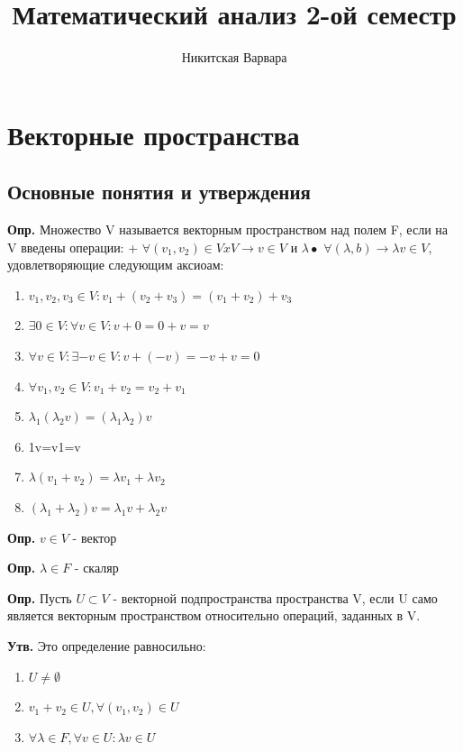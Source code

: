 \documentclass[12pt]{article}
\title{Математический анализ 2-ой семестр}
\author{Никитская Варвара}
\begin{document}
\tableofcontents
\newpage
\section{Векторные пространства}
\subsection{Основные понятия и утверждения}

\textbf{Опр.} Множество V называется векторным пространством над полем F, если на V введены операции: + $\forall (v_1, v_2) \in VxV \rightarrow v \in V$ и $\lambda \bullet$ $\forall (\lambda, b) \rightarrow \lambda v \in V$, удовлетворяющие следующим аксиоам:
\begin{enumerate} 
\item $v_1, v_2, v_3 \in V: v_1+(v_2 + v_3) = (v_1 + v_2) + v_3$ 
\item $\exists 0 \in V: \forall v \in V: v + 0 = 0 + v = v$
\item $\forall v \in V: \exists -v \in V: v + (-v) = -v + v = 0$
\item $\forall v_1, v_2 \in V: v_1 + v_2 = v_2 + v_1 $
\item $\lambda_1(\lambda_2 v) = (\lambda_1\lambda_2 )v$
\item 1v=v1=v
\item $\lambda (v_1 + v_2) = \lambda v_1 + \lambda v_2$
\item $(\lambda_1 + \lambda_2 )v = \lambda_1 v + \lambda_2 v$
\end{enumerate}

\textbf{Опр.} $v \in V$ - вектор
\newline

\textbf{Опр.} $\lambda \in F$ - скаляр
\newline

\textbf{Опр.} Пусть $U \subset V$ - векторной подпространства пространства V, если U само является векторным пространством относительно операций, заданных в V.
\newline 

\textbf{Утв.} Это определение равносильно: 
\begin{enumerate}
\item $U \ne \emptyset$ 
\item $v_1 + v_2 \in U, \forall (v_1,v_2) \in U$
\item $\forall \lambda \in F, \forall v \in U: \lambda v \in U$
\end{enumerate}
\end{document}
